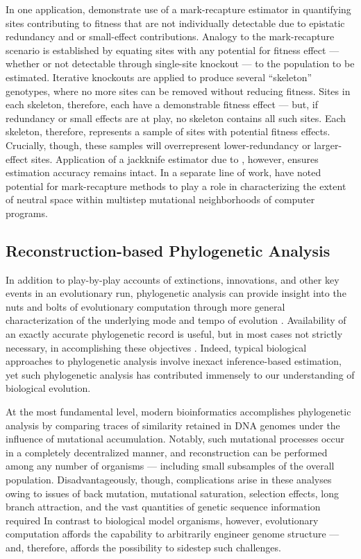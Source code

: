 In one application, \citet{moreno2024methods} demonstrate use of a mark-recapture estimator in quantifying sites contributing to fitness that are not individually detectable due to epistatic redundancy and or small-effect contributions.
Analogy to the mark-recapture scenario is established by equating sites with any potential for fitness effect --- whether or not detectable through single-site knockout --- to the population to be estimated.
Iterative knockouts are applied to produce several ``skeleton'' genotypes, where no more sites can be removed without reducing fitness.
Sites in each skeleton, therefore, each have a demonstrable fitness effect --- but, if redundancy or small effects are at play, no skeleton contains all such sites.
Each skeleton, therefore, represents a sample of sites with potential fitness effects.
Crucially, though, these samples will overrepresent lower-redundancy or larger-effect sites.
Application of a jackknife estimator due to \citet{burnham1979robust}, however, ensures estimation accuracy remains intact.
In a separate line of work, \citet{schulte2014software} have noted potential for mark-recapture methods to play a role in characterizing the extent of neutral space within multistep mutational neighborhoods of computer programs.

\subsection{Reconstruction-based Phylogenetic Analysis}

In addition to play-by-play accounts of extinctions, innovations, and other key events in an evolutionary run, phylogenetic analysis can provide insight into the nuts and bolts of evolutionary computation through more general characterization of the underlying mode and tempo of evolution \citep{moreno2023toward,hernandez2022can,shahbandegan2022untangling,lewinsohnStatedependentEvolutionaryModels2023a}.
Availability of an exactly accurate phylogenetic record is useful, but in most cases not strictly necessary, in accomplishing these objectives \citep{moreno2024ecology}.
Indeed, typical biological approaches to phylogenetic analysis involve inexact inference-based estimation, yet such phylogenetic analysis has contributed immensely to our understanding of biological evolution.

At the most fundamental level, modern bioinformatics accomplishes phylogenetic analysis by comparing traces of similarity retained in DNA genomes under the influence of mutational accumulation.
Notably, such mutational processes occur in a completely decentralized manner, and reconstruction can be performed among any number of organisms --- including small subsamples of the overall population.
Disadvantageously, though, complications arise in these analyses owing to issues of back mutation, mutational saturation, selection effects, long branch attraction, and the vast quantities of genetic sequence information required \citep{TODO}
In contrast to biological model organisms, however, evolutionary computation affords the capability to arbitrarily engineer genome structure --- and, therefore, affords the possibility to sidestep such challenges.

